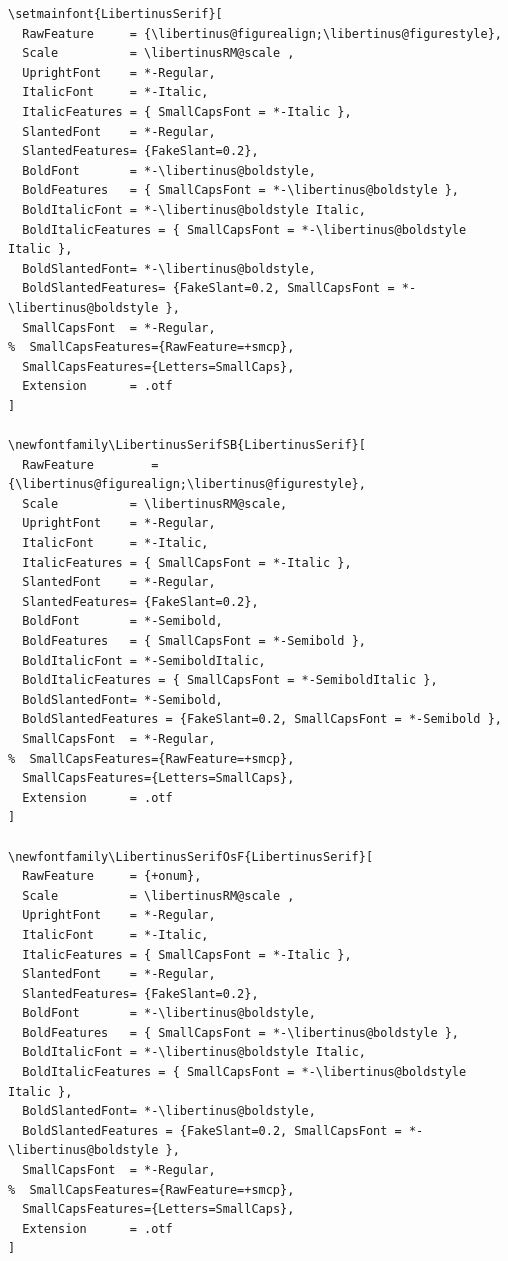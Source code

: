 \documentclass[ngerman,spanish,polish,english,a4paper]{article}
\begin{document}
\begin{verbatim}
\setmainfont{LibertinusSerif}[ 
  RawFeature     = {\libertinus@figurealign;\libertinus@figurestyle},
  Scale          = \libertinusRM@scale ,
  UprightFont    = *-Regular,
  ItalicFont     = *-Italic,
  ItalicFeatures = { SmallCapsFont = *-Italic },
  SlantedFont    = *-Regular,
  SlantedFeatures= {FakeSlant=0.2},
  BoldFont       = *-\libertinus@boldstyle,
  BoldFeatures   = { SmallCapsFont = *-\libertinus@boldstyle },
  BoldItalicFont = *-\libertinus@boldstyle Italic,
  BoldItalicFeatures = { SmallCapsFont = *-\libertinus@boldstyle Italic },
  BoldSlantedFont= *-\libertinus@boldstyle,
  BoldSlantedFeatures= {FakeSlant=0.2, SmallCapsFont = *-\libertinus@boldstyle },
  SmallCapsFont  = *-Regular,
%  SmallCapsFeatures={RawFeature=+smcp},
  SmallCapsFeatures={Letters=SmallCaps}, 
  Extension      = .otf  
]

\newfontfamily\LibertinusSerifSB{LibertinusSerif}[
  RawFeature        = {\libertinus@figurealign;\libertinus@figurestyle},
  Scale          = \libertinusRM@scale,
  UprightFont    = *-Regular,
  ItalicFont     = *-Italic,
  ItalicFeatures = { SmallCapsFont = *-Italic },
  SlantedFont    = *-Regular,
  SlantedFeatures= {FakeSlant=0.2},
  BoldFont       = *-Semibold, 
  BoldFeatures   = { SmallCapsFont = *-Semibold },
  BoldItalicFont = *-SemiboldItalic,
  BoldItalicFeatures = { SmallCapsFont = *-SemiboldItalic },
  BoldSlantedFont= *-Semibold,
  BoldSlantedFeatures = {FakeSlant=0.2, SmallCapsFont = *-Semibold },
  SmallCapsFont  = *-Regular,
%  SmallCapsFeatures={RawFeature=+smcp},
  SmallCapsFeatures={Letters=SmallCaps}, 
  Extension      = .otf  
]

\newfontfamily\LibertinusSerifOsF{LibertinusSerif}[
  RawFeature     = {+onum},
  Scale          = \libertinusRM@scale ,
  UprightFont    = *-Regular,
  ItalicFont     = *-Italic,
  ItalicFeatures = { SmallCapsFont = *-Italic },
  SlantedFont    = *-Regular,
  SlantedFeatures= {FakeSlant=0.2},
  BoldFont       = *-\libertinus@boldstyle, 
  BoldFeatures   = { SmallCapsFont = *-\libertinus@boldstyle },
  BoldItalicFont = *-\libertinus@boldstyle Italic,
  BoldItalicFeatures = { SmallCapsFont = *-\libertinus@boldstyle Italic },
  BoldSlantedFont= *-\libertinus@boldstyle,
  BoldSlantedFeatures = {FakeSlant=0.2, SmallCapsFont = *-\libertinus@boldstyle },
  SmallCapsFont  = *-Regular,
%  SmallCapsFeatures={RawFeature=+smcp},
  SmallCapsFeatures={Letters=SmallCaps}, 
  Extension      = .otf  
]


\end{verbatim}
\end{document}
